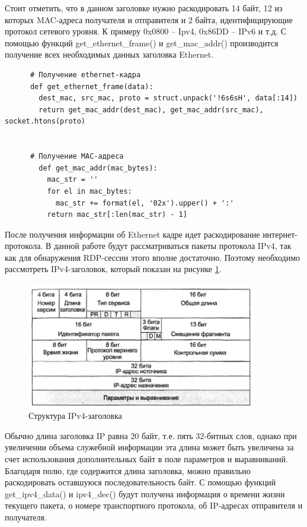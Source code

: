 \documentclass[bachelor, och, coursework]{SCWorks}
\begin{document}
    Стоит отметить, что в данном заголовке нужно раскодировать 14 байт, 12 из которых MAC-адреса получателя и отправителя и 2 байта, идентифицирующие протокол
    сетевого уровня. К примеру 0x0800 -- Ipv4, 0x86DD -- IPv6 и т.д. С помощью функций get\_ethernet\_frame() и get\_mac\_addr() производится получение всех необходимых
    данных заголовка Ethernet.
    
    \begin{verbatim}
      # Получение ethernet-кадра
      def get_ethernet_frame(data):
        dest_mac, src_mac, proto = struct.unpack('!6s6sH', data[:14])
        return get_mac_addr(dest_mac), get_mac_addr(src_mac), socket.htons(proto)
      
      
      # Получение MAC-адреса
        def get_mac_addr(mac_bytes):
          mac_str = ''
          for el in mac_bytes:
            mac_str += format(el, '02x').upper() + ':'
          return mac_str[:len(mac_str) - 1]
      \end{verbatim}

    После получения информации об Ethernet кадре идет раскодирование интернет-протокола. В данной работе будут рассматриваться пакеты протокола IPv4, 
    так как для обнаружения RDP-сессии этого вполне достаточно. Поэтому необходимо рассмотреть IPv4-заголовок, который показан на рисунке \ref{ipv4-header}.

    \begin{figure}[H]
      \centering
      \includegraphics[width=0.9\textwidth]{photo/ipv4-header.jpg}
      \caption{Структура IPv4-заголовка}
      \label{ipv4-header}
    \end{figure}
      
    Обычно длина заголовка IP равна 20 байт, т.е. пять 32-битных слов, однако при увеличении объема служебной информации эта длина может быть увеличена
    за счет использования дополнительных байт в поле параметров и выравниваний. Благодаря полю, где содержится
    длина заголовка, можно правильно раскодировать оставшуюся последовательность байт. С помощью функций get\_ipv4\_data() и ipv4\_dec() будут получена 
    информация о времени жизни текущего пакета, о номере транспортного протокола, об IP-адресах отправителя и получателя.
  
\end{document}
